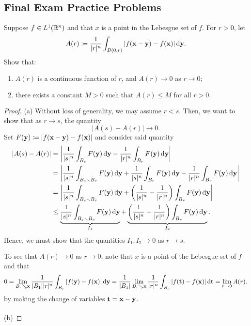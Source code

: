 \subsection{Final Exam Practice Problems}
\begin{problem}
Suppose $f\in L^1(\mathbb{R}^n)$ and that $x$ is a point in the Lebesgue set of
$f$. For $r>0$, let
\[
A(r)\coloneqq\frac{1}{|r|^n}\int_{B(0,r)}|f(\mathbf{x}-\mathbf{y})-f(\mathbf{x})|\mathop{}\!\mathrm{d}\mathbf{y}.
\]
Show that:
\begin{enumerate}[label=(\alph*),noitemsep]
\item $A(r)$ is a continuous function of $r$, and $A(r)\to 0$ as $r\to 0$;
\item there exists a constant $M>0$ such that $A(r)\leq M$ for all $r>0$.
\end{enumerate}
\end{problem}
\begin{proof}
(a) Without loss of generality, we may assume $r<s$. Then, we want to show
that as $r\to s$, the quantity
\[
|A(s)-A(r)|\longrightarrow 0.
\]
Set $F(\mathbf{y})\coloneqq |f(\mathbf{x}-\mathbf{y})-f(\mathbf{x})|$ and consider said quantity
\begin{align*}
|A(s)-A(r)|
&=\left|
\frac{1}{|s|^n}\int_{B_s}F(\bfy)\diff\bfy
-
\frac{1}{|r|^n}\int_{B_r}F(\bfy)\diff\bfy
\right|\\
&=\left|
\frac{1}{|s|^n}\int_{B_s\smallsetminus B_r}F(\bfy)\diff\bfy+
\frac{1}{|s|^n}\int_{B_r}F(\bfy)\diff\bfy-
\frac{1}{|r|^n}\int_{B_r}F(\bfy)\diff\bfy
\right|\\
&=\left|
\frac{1}{|s|^n}\int_{B_s\smallsetminus B_r}F(\bfy)\diff\bfy
+\left(\frac{1}{|s|^n}-\frac{1}{|r|^n}\right)\int_{B_r}F(\bfy)\diff\bfy
\right|\\
&\leq
\underbrace{\frac{1}{|s|^n}\int_{B_s\smallsetminus B_r}F(\bfy)\diff\bfy}_{I_1}
+\underbrace{\left(\frac{1}{|s|^n}-\frac{1}{|r|^n}\right)\int_{B_r}F(\bfy)\diff\bfy}_{I_2}.
\end{align*}
Hence, we must show that the quantities $I_1,I_2\to 0$ as $r\to s$.

To see that $A(r)\to 0$ as $r\to 0$, note that $x$ is a point of the
Lebesgue set of $f$ and that
\[
0=\lim_{B_r\searrow\mathbf{x}}\frac{1}{|B_1||r|^n}\int_{B_r}|f(\mathbf{y})-f(\mathbf{x})|\mathop{}\!\mathrm{d}\mathbf{y}=\frac{1}{|B_1|}\lim_{B_r\searrow\mathbf{x}}\frac{1}{|r|^n}\int_{B_r}|f(\mathbf{t})-f(\mathbf{x})|\mathop{}\!\mathrm{d}\mathbf{t}=\lim_{r\to
0}A(r).
\]
by making the change of variables $\mathbf{t}=\mathbf{x}-\mathbf{y}$.
\\\\
(b)
\end{proof}

